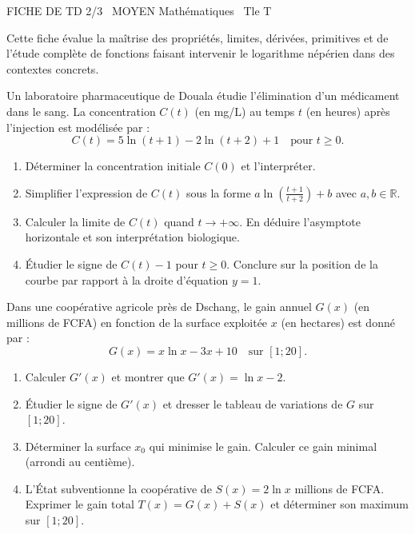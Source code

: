 \documentclass[11pt]{article}
\begin{document}
\begin{tcolorbox}[enhanced,colback=popink,colframe=popink,arc=10pt,boxrule=0pt,left=12pt,right=12pt,top=9pt,bottom=9pt]
{\color{white}\popxbold\small FICHE DE TD 2/3 \textbullet\ MOYEN \hfill Mathématiques \textbullet\ Tle T\par}
\end{tcolorbox}
\vspace{4pt}
Cette fiche évalue la maîtrise des propriétés, limites, dérivées, primitives et de l'étude complète de fonctions faisant intervenir le logarithme népérien dans des contextes concrets.

\begin{exercice}
Un laboratoire pharmaceutique de Douala étudie l'élimination d'un médicament dans le sang. La concentration $C(t)$ (en mg/L) au temps $t$ (en heures) après l'injection est modélisée par :
$$C(t) = 5\ln(t+1) - 2\ln(t+2) + 1 \quad \text{pour } t \geq 0.$$
\begin{enumerate}
    \item Déterminer la concentration initiale $C(0)$ et l'interpréter.
    \item Simplifier l'expression de $C(t)$ sous la forme $a\ln\left(\frac{t+1}{t+2}\right) + b$ avec $a,b \in \mathbb{R}$.
    \item Calculer la limite de $C(t)$ quand $t \to +\infty$. En déduire l'asymptote horizontale et son interprétation biologique.
    \item Étudier le signe de $C(t) - 1$ pour $t \geq 0$. Conclure sur la position de la courbe par rapport à la droite d'équation $y=1$.
\end{enumerate}
\end{exercice}

\begin{exercice}
Dans une coopérative agricole près de Dschang, le gain annuel $G(x)$ (en millions de FCFA) en fonction de la surface exploitée $x$ (en hectares) est donné par :
$$G(x) = x\ln x - 3x + 10 \quad \text{sur } [1 ; 20].$$
\begin{enumerate}
    \item Calculer $G'(x)$ et montrer que $G'(x) = \ln x - 2$.
    \item Étudier le signe de $G'(x)$ et dresser le tableau de variations de $G$ sur $[1 ; 20]$.
    \item Déterminer la surface $x_0$ qui minimise le gain. Calculer ce gain minimal (arrondi au centième).
    \item L'État subventionne la coopérative de $S(x) = 2\ln x$ millions de FCFA. Exprimer le gain total $T(x) = G(x) + S(x)$ et déterminer son maximum sur $[1 ; 20]$.
\end{enumerate}
\end{exercice}
\end{document}
